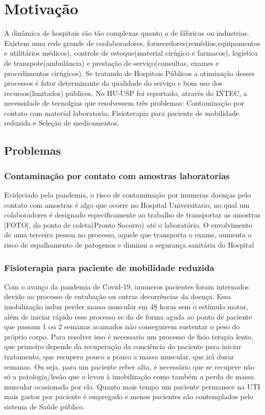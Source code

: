 \documentclass[../poliXuniversity_hospital_(USP)_report.tex]{subfiles}
\begin{document}
\chapter{Motivação}

A dinâmica de hospitais são tão complexas quanto a de fábricas ou industrias. Existem uma rede grande de coolaboradores, fornecedores(remédios,equipamentos e utilitários médicos), controle de estoque(material cirúgico e farmacos), logística de transpote(ambulância) e prestação de serviço(consultas, exames e procedimentos cirúgicos). Se tratando de Hospitais Públicos a otimização desses processos é fator determinante da qualidade do serviço e bom uso dos recursos(limitados) públicos. No HU-USP foi reportado, através do INTEC, a necessidade de tecnolgias que resolvessem três problemas: Contaminação por contato com material laboratoria; Fisioterapia para paciente de mobilidade reduzida e Seleção de medicamentos.

\section{Problemas}

\subsection{Contaminação por contato com amostras laboratorias}

Evideciado pela pandemia, o risco de contaminação por inumeras doenças pelo contato com amostras é algo que ocorre no Hospital Universitario, no qual um colaboradores é designado especificamente ao trabalho de transportar as amostras [FOTO], do ponto de coleta(Pronto Socorro) até o laboratório. O envolvimento de uma terceira pessoa no processo, aquele que transporta o exame, aumenta o risco de espalhamento de patogenos e diminui a segurança sanitária do Hospital

\subsection{Fisioterapia para paciente de mobilidade reduzida}

Com o avanço da pandemia de Covid-19, inumeros pacientes foram internados devido ao processo de entubação ou outras decorrências da doença. Essa imobilização induz perder massa muscular em 48 horas sem o estímulo motor, além de iniciar rápido esse processo se da de forma aguda ao ponto de paciente que passam 1 ou 2 semanas acamados não conseguirem sustentar o peso do próprio corpo. Para resolver isso é necessario um processo de fisio terapia lento, que primeiro depende da recuperação da conciência do paciente para iniciar tratamento, que recupera pouco a pouco a massa muscular, que irá durar semanas. Ou seja, para um paciente reber alta, é necessário que se recupere não só a patologia/lesão que o levou à imobilização como também a perda de massa muscular ocasionada por ela. Quanto mais tempo um paciente permanece na UTI mais gastos por paciente é empregado e menos pacientes são contemplados pelo sistema de Saúde público.
\end{document}
